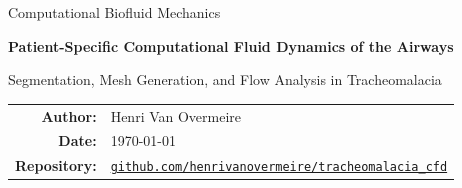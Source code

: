 \documentclass[11pt,a4paper]{article}
\newcommand{\reporttitle}{Patient-Specific Computational Fluid Dynamics of the Airways}
\newcommand{\reportsubtitle}{Segmentation, Mesh Generation, and Flow Analysis in Tracheomalacia}
\newcommand{\reportauthor}{Henri Van Overmeire}
\newcommand{\reportdate}{\today}
\begin{document}
\hypersetup{pageanchor=false}

\begin{titlepage}
  \centering
  \vspace*{2.5cm}

  {\Large Computational Biofluid Mechanics\par}
  \vspace{1.5cm}

  {\Huge\bfseries \reporttitle\par}
  \vspace{0.6cm}
  {\Large \reportsubtitle\par}

  \vfill

  \begin{tabular}{rl}
    \textbf{Author:} & \reportauthor \\
    \textbf{Date:}   & \reportdate \\
    \textbf{Repository:} &
    \href{https://github.com/henrivanovermeire/tracheomalacia_cfd/settings}
    {\texttt{github.com/henrivanovermeire/tracheomalacia\_cfd}}
  \end{tabular}

  \vfill


\end{titlepage}

\hypersetup{pageanchor=true}
\end{document}
